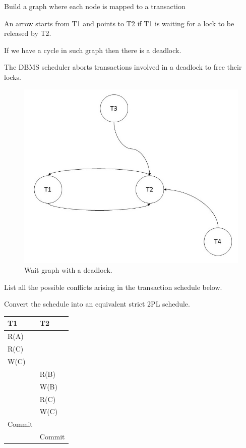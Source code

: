 \documentclass{beamer}
\begin{document}
\begin{slide}{
	\item Build a graph where each node is mapped to a transaction
	\item An arrow starts from T1 and points to T2 if T1 is waiting for a lock to be released by T2.
	\item If we have a cycle in such graph then there is a deadlock.
	\item The DBMS scheduler aborts transactions involved in a deadlock to free their locks.
	\begin{figure}
		\includegraphics[scale=0.2]{img/wait_graph}
		\caption{Wait graph with a deadlock.}
	\end{figure}
}\end{slide}

\begin{slide}{
	\item List all the possible conflicts arising in the transaction schedule below.
	\item Convert the schedule into an equivalent strict 2PL schedule.
	\begin{table}
		\tiny
		\begin{tabular}{l|l}
			T1 & T2\\
			\hline
			R(A) & \\
			R(C) & \\
			W(C) & \\
			& R(B) \\
			& W(B) \\
			& R(C) \\
			& W(C) \\
			Commit & \\
			& Commit \\		
		\end{tabular}
	\end{table}	
	
}\end{slide}
\end{document}
